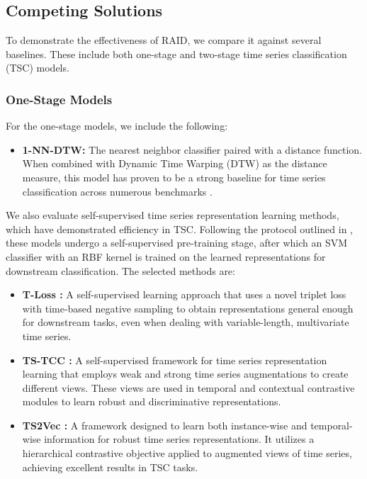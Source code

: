 
\subsection{Competing Solutions}
To demonstrate the effectiveness of RAID, we compare it against several baselines. These include both one-stage and two-stage time series classification (TSC) models. 

\subsubsection{One-Stage Models}
For the one-stage models, we include the following:
\begin{itemize}
    \item \textbf{1-NN-DTW:} The nearest neighbor classifier paired with a distance function. When combined with Dynamic Time Warping (DTW) as the distance measure, this model has proven to be a strong baseline for time series classification across numerous benchmarks \cite{bagnall2017great}. 
\end{itemize}

We also evaluate self-supervised time series representation learning methods, which have demonstrated efficiency in TSC. Following the protocol outlined in \cite{franceschi2019unsupervised}, these models undergo a self-supervised pre-training stage, after which an SVM classifier with an RBF kernel is trained on the learned representations for downstream classification. The selected methods are:
\begin{itemize}
    \item \textbf{T-Loss \cite{franceschi2019unsupervised}:} A self-supervised learning approach that uses a novel triplet loss with time-based negative sampling to obtain representations general enough for downstream tasks, even when dealing with variable-length, multivariate time series.
    \item \textbf{TS-TCC \cite{Eldele2021TimeSeriesRL}:} A self-supervised framework for time series representation learning that employs weak and strong time series augmentations to create different views. These views are used in temporal and contextual contrastive modules to learn robust and discriminative representations.
    \item \textbf{TS2Vec \cite{Yue2021TS2VecTU}:} A framework designed to learn both instance-wise and temporal-wise information for robust time series representations. It utilizes a hierarchical contrastive objective applied to augmented views of time series, achieving excellent results in TSC tasks.
\end{itemize}

